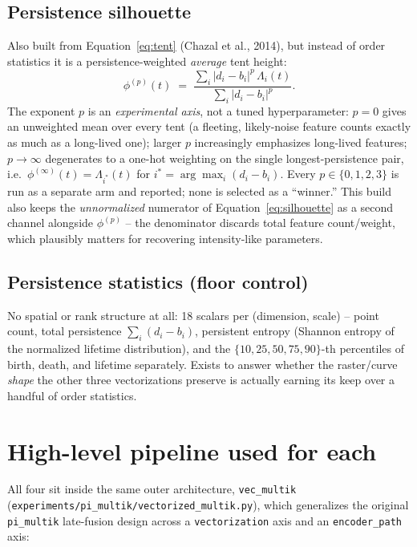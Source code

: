 \documentclass[11pt]{article}
\begin{document}
\subsection{Persistence silhouette}
Also built from Equation~\ref{eq:tent} (Chazal et al., 2014), but instead of order
statistics it is a persistence-weighted \emph{average} tent height:
\begin{equation}
  \phi^{(p)}(t) \;=\; \frac{\sum_i |d_i-b_i|^p\, \Lambda_i(t)}{\sum_i |d_i-b_i|^p}.
  \label{eq:silhouette}
\end{equation}
The exponent $p$ is an \emph{experimental axis}, not a tuned hyperparameter: $p=0$
gives an unweighted mean over every tent (a fleeting, likely-noise feature counts
exactly as much as a long-lived one); larger $p$ increasingly emphasizes long-lived
features; $p\to\infty$ degenerates to a one-hot weighting on the single
longest-persistence pair, i.e.\ $\phi^{(\infty)}(t) = \Lambda_{i^\ast}(t)$ for
$i^\ast = \arg\max_i (d_i-b_i)$. Every $p\in\{0,1,2,3\}$ is run as a separate arm and
reported; none is selected as a ``winner.'' This build also keeps the
\emph{unnormalized} numerator of Equation~\ref{eq:silhouette} as a second channel
alongside $\phi^{(p)}$ -- the denominator discards total feature count/weight, which
plausibly matters for recovering intensity-like parameters.

\subsection{Persistence statistics (floor control)}
No spatial or rank structure at all: 18 scalars per (dimension, scale) -- point count,
total persistence $\sum_i(d_i-b_i)$, persistent entropy (Shannon entropy of the
normalized lifetime distribution), and the $\{10,25,50,75,90\}$-th percentiles of
birth, death, and lifetime separately. Exists to answer whether the raster/curve
\emph{shape} the other three vectorizations preserve is actually earning its keep over
a handful of order statistics.

\section{High-level pipeline used for each}
\label{sec:pipeline}

All four sit inside the same outer architecture, \texttt{vec\_multik}
(\texttt{experiments/pi\_multik/vectorized\_multik.py}), which generalizes the
original \texttt{pi\_multik} late-fusion design across a \texttt{vectorization} axis
and an \texttt{encoder\_path} axis:
\end{document}
